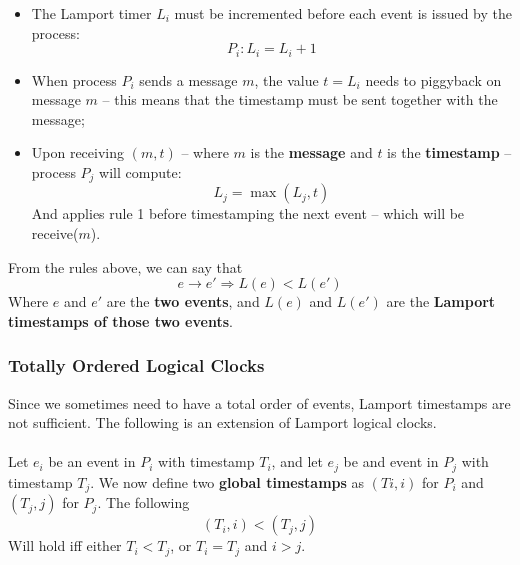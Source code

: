 \documentclass{article}
\begin{document}
\begin{itemize}
	\item The Lamport timer $L_i$ must be incremented before each event is issued by the process:
	\[ P_i : L_i = L_i + 1 \]
	\item When process $P_i$ sends a message $m$, the value $t = L_i$ needs to piggyback on message $m$ -- this means that the timestamp must be sent together with the message;
	\item Upon receiving $(m, t)$ -- where $m$ is the \textbf{message} and $t$ is the \textbf{timestamp} -- process $P_j$ will compute:
	\[ L_j = \max(L_j, t) \]
	And applies rule 1 before timestamping the next event -- which will be receive($m$).
\end{itemize}
From the rules above, we can say that
\[ e \rightarrow e' \Rightarrow L(e) < L(e') \]
Where $e$ and $e'$ are the \textbf{two events}, and $L(e)$ and $L(e')$ are the \textbf{Lamport timestamps of those two events}.

\subsubsection{Totally Ordered Logical Clocks}
Since we sometimes need to have a total order of events, Lamport timestamps are not sufficient. The following is an extension of Lamport logical clocks.\\ \\
Let $e_i$ be an event in $P_i$ with timestamp $T_i$, and let $e_j$ be and event in $P_j$ with timestamp $T_j$. We now define two \textbf{global timestamps} as $(Ti, i)$ for $P_i$ and $(T_j, j)$ for $P_j$. The following
\[ (T_i, i) < (T_j, j) \]
Will hold iff either $T_i < T_j$, or $T_i = T_j$ and $i > j$.
\end{document}

